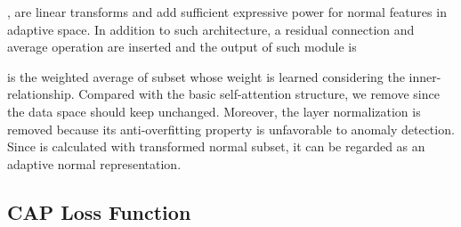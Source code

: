\documentclass{article}
\begin{document}
,  are linear transforms and add sufficient expressive power for normal features in adaptive space. In addition to such architecture, a residual connection and average operation are inserted and the output of such module is

 is the weighted average of subset  whose weight is learned considering the inner-relationship. Compared with the basic self-attention structure, we remove  since the data space should keep unchanged. Moreover, the layer normalization is removed because its anti-overfitting property is unfavorable to anomaly detection. Since  is calculated with transformed normal subset, it can be regarded as an adaptive normal representation.


\subsection{CAP Loss Function}



\begin{table*}[h]
\caption{Anomaly detection performance (Average AUROC \%).}
\label{tab:overall}
\vspace{-0.3cm}
\begin{center}
\end{center}
\end{table*}
\end{document}
